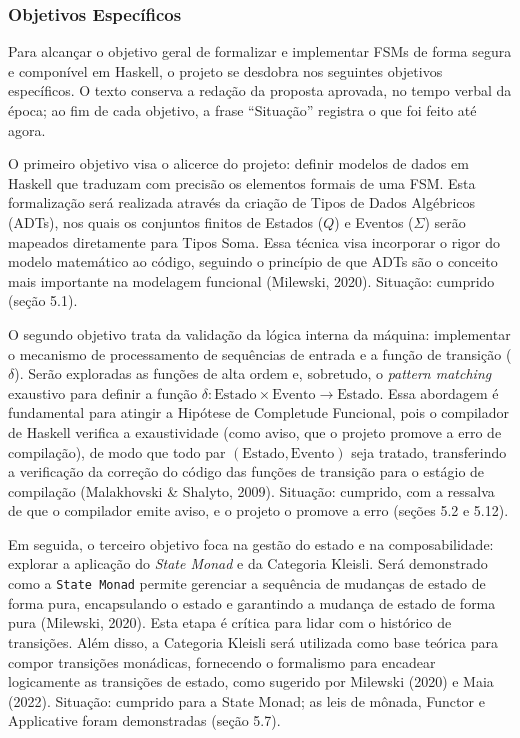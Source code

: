 \documentclass[12pt,a4paper]{article}
\begin{document}
\subsubsection{Objetivos Específicos}

Para alcançar o objetivo geral de formalizar e implementar FSMs de forma segura e componível em Haskell, o projeto se desdobra nos seguintes objetivos específicos. O texto conserva a redação da proposta aprovada, no tempo verbal da época; ao fim de cada objetivo, a frase ``Situação'' registra o que foi feito até agora.

O primeiro objetivo visa o alicerce do projeto: definir modelos de dados em Haskell que traduzam com precisão os elementos formais de uma FSM. Esta formalização será realizada através da criação de Tipos de Dados Algébricos (ADTs), nos quais os conjuntos finitos de Estados ($Q$) e Eventos ($\Sigma$) serão mapeados diretamente para Tipos Soma. Essa técnica visa incorporar o rigor do modelo matemático ao código, seguindo o princípio de que ADTs são o conceito mais importante na modelagem funcional (Milewski, 2020). Situação: cumprido (seção 5.1).

O segundo objetivo trata da validação da lógica interna da máquina: implementar o mecanismo de processamento de sequências de entrada e a função de transição ($\delta$). Serão exploradas as funções de alta ordem e, sobretudo, o \textit{pattern matching} exaustivo para definir a função $\delta: \text{Estado} \times \text{Evento} \to \text{Estado}$. Essa abordagem é fundamental para atingir a Hipótese de Completude Funcional, pois o compilador de Haskell verifica a exaustividade (como aviso, que o projeto promove a erro de compilação), de modo que todo par $(\text{Estado}, \text{Evento})$ seja tratado, transferindo a verificação da correção do código das funções de transição para o estágio de compilação (Malakhovski \& Shalyto, 2009). Situação: cumprido, com a ressalva de que o compilador emite aviso, e o projeto o promove a erro (seções 5.2 e 5.12).

Em seguida, o terceiro objetivo foca na gestão do estado e na composabilidade: explorar a aplicação do \textit{State Monad} e da Categoria Kleisli. Será demonstrado como a \texttt{State Monad} permite gerenciar a sequência de mudanças de estado de forma pura, encapsulando o estado e garantindo a mudança de estado de forma pura (Milewski, 2020). Esta etapa é crítica para lidar com o histórico de transições. Além disso, a Categoria Kleisli será utilizada como base teórica para compor transições monádicas, fornecendo o formalismo para encadear logicamente as transições de estado, como sugerido por Milewski (2020) e Maia (2022). Situação: cumprido para a State Monad; as leis de mônada, Functor e Applicative foram demonstradas (seção 5.7).
\end{document}
